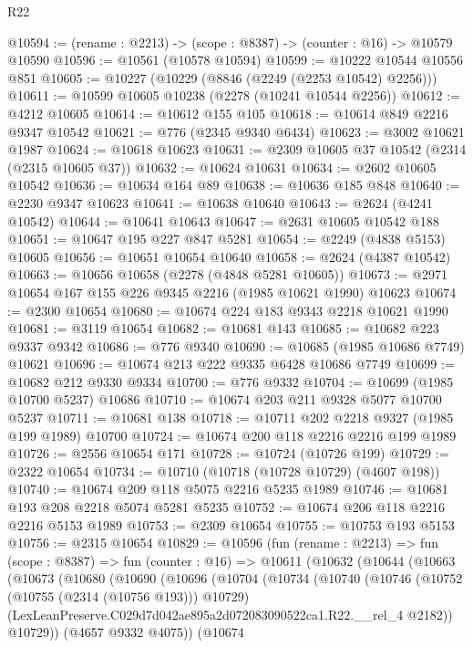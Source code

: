 \begin{lexlean}{R22}
\begin{coremodule}
@10594 := (rename : @2213) -> (scope : @8387) -> (counter : @16) -> @10579 @10590
@10596 := @10561 (@10578 @10594)
@10599 := @10222 @10544 @10556 @851
@10605 := @10227 (@10229 (@8846 (@2249 (@2253 @10542) @2256)))
@10611 := @10599 @10605 @10238 (@2278 (@10241 @10544 @2256))
@10612 := @4212 @10605
@10614 := @10612 @155 @105
@10618 := @10614 @849 @2216 @9347 @10542
@10621 := @776 (@2345 @9340 @6434)
@10623 := @3002 @10621 @1987
@10624 := @10618 @10623
@10631 := @2309 @10605 @37 @10542 (@2314 (@2315 @10605 @37))
@10632 := @10624 @10631
@10634 := @2602 @10605 @10542
@10636 := @10634 @164 @89
@10638 := @10636 @185 @848
@10640 := @2230 @9347 @10623
@10641 := @10638 @10640
@10643 := @2624 (@4241 @10542)
@10644 := @10641 @10643
@10647 := @2631 @10605 @10542 @188
@10651 := @10647 @195 @227 @847 @5281
@10654 := @2249 (@4838 @5153) @10605
@10656 := @10651 @10654 @10640
@10658 := @2624 (@4387 @10542)
@10663 := @10656 @10658 (@2278 (@4848 @5281 @10605))
@10673 := @2971 @10654 @167 @155 @226 @9345 @2216 (@1985 @10621 @1990) @10623
@10674 := @2300 @10654
@10680 := @10674 @224 @183 @9343 @2218 @10621 @1990
@10681 := @3119 @10654
@10682 := @10681 @143
@10685 := @10682 @223 @9337 @9342
@10686 := @776 @9340
@10690 := @10685 (@1985 @10686 @7749) @10621
@10696 := @10674 @213 @222 @9335 @6428 @10686 @7749
@10699 := @10682 @212 @9330 @9334
@10700 := @776 @9332
@10704 := @10699 (@1985 @10700 @5237) @10686
@10710 := @10674 @203 @211 @9328 @5077 @10700 @5237
@10711 := @10681 @138
@10718 := @10711 @202 @2218 @9327 (@1985 @199 @1989) @10700
@10724 := @10674 @200 @118 @2216 @2216 @199 @1989
@10726 := @2556 @10654 @171
@10728 := @10724 (@10726 @199)
@10729 := @2322 @10654
@10734 := @10710 (@10718 (@10728 @10729) (@4607 @198))
@10740 := @10674 @209 @118 @5075 @2216 @5235 @1989
@10746 := @10681 @193 @208 @2218 @5074 @5281 @5235
@10752 := @10674 @206 @118 @2216 @2216 @5153 @1989
@10753 := @2309 @10654
@10755 := @10753 @193 @5153
@10756 := @2315 @10654
@10829 := @10596
    (fun (rename : @2213) =>
    fun (scope : @8387) =>
    fun (counter : @16) =>
    @10611
      (@10632
        (@10644
          (@10663
            (@10673
              (@10680
                (@10690
                  (@10696
                    (@10704
                      (@10734
                        (@10740
                          (@10746
                            (@10752 (@10755 (@2314 (@10756 @193))) @10729)
                            (LexLeanPreserve.C029d7d042ae895a2d072083090522ca1.R22.__rel_4 @2182))
                          @10729))
                      (@4657 @9332 @4075))
                    (@10674

\end{coremodule}
\end{lexlean}
